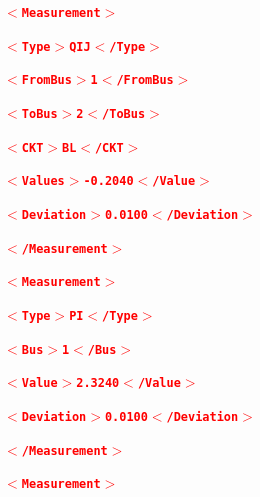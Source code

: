 \documentclass[12pt]{report} %
\begin{document}
\textcolor{red}{\texttt{\textbf{  $\boldsymbol{\mathrm{<}}$Measurement$\boldsymbol{\mathrm{>}}$}}}

\textcolor{red}{\texttt{\textbf{    $\boldsymbol{\mathrm{<}}$Type$\boldsymbol{\mathrm{>}}$QIJ$\boldsymbol{\mathrm{<}}$/Type$\boldsymbol{\mathrm{>}}$}}}

\textcolor{red}{\texttt{\textbf{    $\boldsymbol{\mathrm{<}}$FromBus$\boldsymbol{\mathrm{>}}$1$\boldsymbol{\mathrm{<}}$/FromBus$\boldsymbol{\mathrm{>}}$}}}

\textcolor{red}{\texttt{\textbf{    $\boldsymbol{\mathrm{<}}$ToBus$\boldsymbol{\mathrm{>}}$2$\boldsymbol{\mathrm{<}}$/ToBus$\boldsymbol{\mathrm{>}}$}}}

\textcolor{red}{\texttt{\textbf{    $\boldsymbol{\mathrm{<}}$CKT$\boldsymbol{\mathrm{>}}$BL$\boldsymbol{\mathrm{<}}$/CKT$\boldsymbol{\mathrm{>}}$}}}

\textcolor{red}{\texttt{\textbf{    $\boldsymbol{\mathrm{<}}$Values$\boldsymbol{\mathrm{>}}$-0.2040$\boldsymbol{\mathrm{<}}$/Value$\boldsymbol{\mathrm{>}}$}}}

\textcolor{red}{\texttt{\textbf{    $\boldsymbol{\mathrm{<}}$Deviation$\boldsymbol{\mathrm{>}}$0.0100$\boldsymbol{\mathrm{<}}$/Deviation$\boldsymbol{\mathrm{>}}$}}}

\textcolor{red}{\texttt{\textbf{  $\boldsymbol{\mathrm{<}}$/Measurement$\boldsymbol{\mathrm{>}}$}}}

\textcolor{red}{\texttt{\textbf{  $\boldsymbol{\mathrm{<}}$Measurement$\boldsymbol{\mathrm{>}}$}}}

\textcolor{red}{\texttt{\textbf{    $\boldsymbol{\mathrm{<}}$Type$\boldsymbol{\mathrm{>}}$PI$\boldsymbol{\mathrm{<}}$/Type$\boldsymbol{\mathrm{>}}$}}}

\textcolor{red}{\texttt{\textbf{    $\boldsymbol{\mathrm{<}}$Bus$\boldsymbol{\mathrm{>}}$1$\boldsymbol{\mathrm{<}}$/Bus$\boldsymbol{\mathrm{>}}$}}}

\textcolor{red}{\texttt{\textbf{    $\boldsymbol{\mathrm{<}}$Value$\boldsymbol{\mathrm{>}}$2.3240$\boldsymbol{\mathrm{<}}$/Value$\boldsymbol{\mathrm{>}}$}}}

\textcolor{red}{\texttt{\textbf{    $\boldsymbol{\mathrm{<}}$Deviation$\boldsymbol{\mathrm{>}}$0.0100$\boldsymbol{\mathrm{<}}$/Deviation$\boldsymbol{\mathrm{>}}$}}}

\textcolor{red}{\texttt{\textbf{  $\boldsymbol{\mathrm{<}}$/Measurement$\boldsymbol{\mathrm{>}}$}}}

\textcolor{red}{\texttt{\textbf{  $\boldsymbol{\mathrm{<}}$Measurement$\boldsymbol{\mathrm{>}}$}}}
\end{document}

